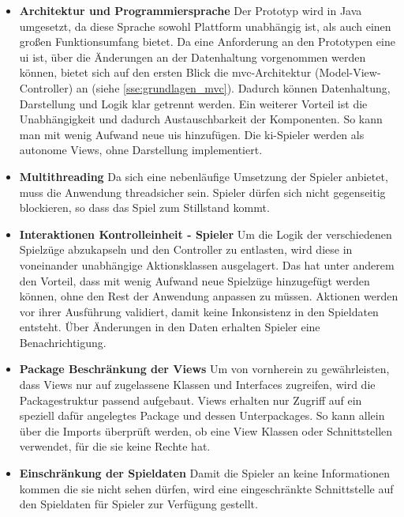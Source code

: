 \documentclass[
							a4paper, 
							11pt, 
							openany, 
							liststotoc,
							parskip=half, 
   							headings=normal
						]{scrreprt}
\begin{document}
{\begin{itemize}
	\item \textbf{Architektur und Programmiersprache}\newline
Der Prototyp wird in Java umgesetzt, da diese Sprache sowohl Plattform unabhängig ist, als auch einen großen Funktionsumfang bietet. Da eine Anforderung an den Prototypen eine \acs{ui} ist, über die Änderungen an der Datenhaltung vorgenommen werden können, bietet sich auf den ersten Blick die \acs{mvc}-Architektur (Model-View-Controller) an (siehe \autoref{sse:grundlagen_mvc}). Dadurch können Datenhaltung, Darstellung und Logik klar getrennt werden. Ein weiterer Vorteil ist die Unabhängigkeit und dadurch Austauschbarkeit der Komponenten. So kann man mit wenig Aufwand neue \acs{ui}s hinzufügen. Die \acs{ki}-Spieler werden als autonome Views, ohne Darstellung implementiert.
	\item \textbf{Multithreading}\newline
Da sich eine nebenläufige Umsetzung der Spieler anbietet, muss die Anwendung threadsicher sein. Spieler dürfen sich nicht gegenseitig blockieren, so dass das Spiel zum Stillstand kommt.
	\item \textbf{Interaktionen Kontrolleinheit - Spieler}\newline
Um die Logik der verschiedenen Spielzüge abzukapseln und den Controller zu entlasten, wird diese in voneinander unabhängige Aktionsklassen ausgelagert.
Das hat unter anderem den Vorteil, dass mit wenig Aufwand neue Spielzüge hinzugefügt werden können, ohne den Rest der Anwendung anpassen zu müssen. Aktionen werden vor ihrer Ausführung validiert, damit keine Inkonsistenz in den Spieldaten entsteht. Über Änderungen in den Daten erhalten Spieler eine Benachrichtigung.
	\item \textbf{Package Beschränkung der Views}\newline
Um von vornherein zu gewährleisten, dass Views nur auf zugelassene Klassen und Interfaces zugreifen, wird die Packagestruktur passend aufgebaut. Views erhalten nur Zugriff auf ein speziell dafür angelegtes Package und dessen Unterpackages. So kann allein über die Imports überprüft werden, ob eine View Klassen oder Schnittstellen verwendet, für die sie keine Rechte hat.
	\item \textbf{Einschränkung der Spieldaten}\newline
Damit die Spieler an keine Informationen kommen die sie nicht sehen dürfen, wird eine eingeschränkte Schnittstelle auf den Spieldaten für Spieler zur Verfügung gestellt.

\end{itemize}}
\end{document}
